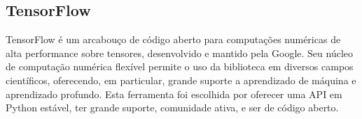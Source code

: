 
\subsection{TensorFlow}
\label{sec:tensorflow}

TensorFlow é um arcabouço de código aberto para computações numéricas de alta performance sobre tensores, desenvolvido e mantido pela Google.
Seu núcleo de computação numérica flexível permite o uso da biblioteca em diversos campos científicos, oferecendo, em particular, grande suporte a aprendizado de máquina e aprendizado profundo.
Esta ferramenta foi escolhida por oferecer uma API em Python estável, ter grande suporte, comunidade ativa, e ser de código aberto.


%

